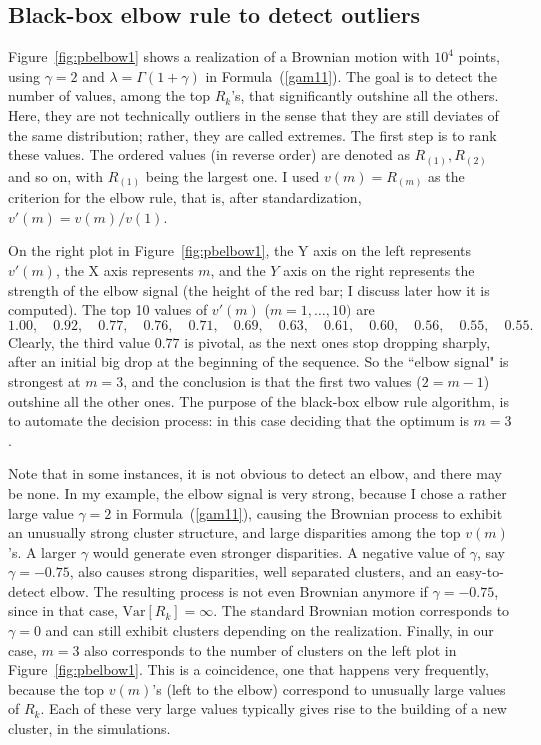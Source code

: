 \documentclass[oneside,10pt]{book}
\begin{document}

\subsection{Black-box elbow rule to detect outliers}\label{elbtr45}

\noindent Figure~\ref{fig:pbelbow1} shows a realization of a \textcolor{index}{Brownian motion} with $10^4$ points, using $\gamma=2$ and
$\lambda=\Gamma(1+\gamma)$ in Formula~(\ref{gam11}).  The goal is to detect the number of values, among the top $R_k$'s, that significantly outshine all the others. Here, they are not technically outliers in the sense that they are still deviates of the same distribution; rather, they are called extremes. 
The first step is to rank these values. The ordered values (in reverse order) are denoted as $R_{(1)},R_{(2)}$ and so on, with $R_{(1)}$ being the largest one. I
used $v(m)=R_{(m)}$ as the criterion for the elbow rule, that is, after standardization, $v'(m)=v(m)/v(1)$. 

On the right plot in Figure~\ref{fig:pbelbow1}, the Y axis on the left represents $v'(m)$, the X axis represents $m$, and the $Y$ axis on the right represents the strength of the elbow signal (the height of the red bar; I discuss later how it is computed). The top 10 values of $v'(m)$ ($m=1,\dots, 10)$ are
$$1.00, \quad
0.92, \quad
0.77,\quad
0.76,\quad
0.71,\quad
0.69,\quad
0.63,\quad
0.61,\quad
0.60,\quad
0.56, \quad
0.55,\quad
0.55.$$
Clearly, the third value $0.77$ is pivotal, as the next ones stop dropping sharply, after an initial big drop at the beginning of the sequence. So the ``elbow signal" is strongest at $m=3$, and the conclusion is that the first two values ($2=m-1$) outshine all the other ones. The purpose of the black-box elbow rule algorithm, is to automate the decision process: in this case deciding that the optimum is $m=3$. 

Note that in some instances, it is not obvious to detect an elbow, and there may be none. In my example, the elbow signal is very strong, because I chose a rather large value $\gamma=2$ in Formula~(\ref{gam11}), causing the Brownian process to exhibit an unusually strong cluster structure, and large disparities among the top $v(m)$'s.
A larger $\gamma$ would generate even stronger disparities. A negative value of $\gamma$, say $\gamma=-0.75$, also causes strong disparities, well separated clusters, and an easy-to-detect elbow. The resulting process is not even Brownian anymore if $\gamma=-0.75$, since in that case, $\mbox{Var}[R_k]=\infty$. The
standard  Brownian motion corresponds to $\gamma=0$ and can still exhibit clusters depending on the realization. Finally, in our case, $m=3$ also corresponds to the number of clusters on the left plot in Figure~\ref{fig:pbelbow1}. This is a coincidence, one that happens very frequently, because the top $v(m)$'s (left to the elbow) correspond to unusually large values of $R_k$. Each of these very large values typically gives
 rise to the building of a new cluster, in the simulations. 
\end{document}

